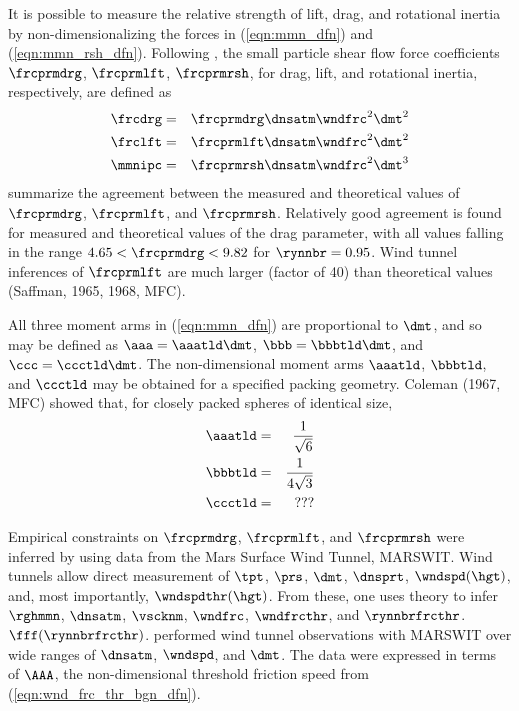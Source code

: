 \documentclass[12pt,twoside]{book}
\begin{document}
It is possible to measure the relative strength of lift, drag, and
rotational inertia by non-dimensionalizing the forces in
(\ref{eqn:mmn_dfn}) and (\ref{eqn:mmn_rsh_dfn}).
Following \cite{GrI85}, the small particle shear flow force
coefficients $\frcprmdrg$, $\frcprmlft$, $\frcprmrsh$, for drag, lift,
and rotational inertia, respectively, are defined as  
\begin{eqnarray}
\label{eqn:mmn_ndm_dfn}
\frcdrg & = & \frcprmdrg \dnsatm \wndfrc^{2} \dmt^{2} \nonumber \\
\frclft & = & \frcprmlft \dnsatm \wndfrc^{2} \dmt^{2} \\
\mmnipc & = & \frcprmrsh \dnsatm \wndfrc^{2} \dmt^{3} \nonumber
\end{eqnarray}
\cite{GrI85} summarize the agreement between the measured and
theoretical values of $\frcprmdrg$, $\frcprmlft$, and $\frcprmrsh$.
Relatively good agreement is found for measured and theoretical values
of the drag parameter, with all values falling in the range $4.65 <
\frcprmdrg < 9.82$ for $\rynnbr = 0.95$.
Wind tunnel inferences of $\frcprmlft$ are much larger (factor of 40)
than theoretical values (Saffman, 1965, 1968, MFC).

All three moment arms in (\ref{eqn:mmn_dfn}) are proportional to
$\dmt$, and so may be defined as $\aaa = \aaatld \dmt$, $\bbb =
\bbbtld \dmt$, and $\ccc = \ccctld \dmt$.  
The non-dimensional moment arms $\aaatld$, $\bbbtld$, and $\ccctld$
may be obtained for a specified packing geometry.  
Coleman (1967, MFC) showed that, for closely packed spheres of
identical size,
\begin{eqnarray}
\aaatld & = & \frac{1}{\sqrt{6}} \nonumber \\
\bbbtld & = & \frac{1}{4 \sqrt{3}} \nonumber \\
\ccctld & = & ???
\label{eqn:arm_ndm_dfn}
\end{eqnarray}

Empirical constraints on $\frcprmdrg$, $\frcprmlft$, and $\frcprmrsh$ 
were inferred by \cite{IvW82} using data from the Mars Surface Wind
Tunnel, MARSWIT.
Wind tunnels allow direct measurement of $\tpt$, $\prs$, $\dmt$,
$\dnsprt$, $\wndspd(\hgt)$, and, most importantly,
$\wndspdthr(\hgt)$. 
From these, one uses theory to infer $\rghmmn$, $\dnsatm$,
$\vscknm$, $\wndfrc$, $\wndfrcthr$, and $\rynnbrfrcthr$.
$\fff(\rynnbrfrcthr)$.
\cite{IvW82} performed wind tunnel observations with MARSWIT over wide
ranges of $\dnsatm$, $\wndspd$, and $\dmt$.
The data were expressed in terms of $\AAA$, the non-dimensional  
threshold friction speed from (\ref{eqn:wnd_frc_thr_bgn_dfn}).
\end{document}
